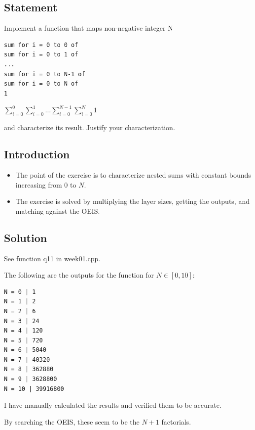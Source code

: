 \documentclass[12pt]{article}
\begin{document}

\subsection{Statement}

Implement a function that maps non-negative integer N

\begin{verbatim}
sum for i = 0 to 0 of
sum for i = 0 to 1 of
...
sum for i = 0 to N-1 of
sum for i = 0 to N of
1
\end{verbatim}

$\displaystyle\sum_{i=0}^{0}\sum_{i=0}^{1}\dots\sum_{i=0}^{N-1}\sum_{i=0}^{N}1$

and characterize its result. Justify your characterization.


\subsection{Introduction}

\begin{itemize}

\item
  The point of the exercise is to characterize nested sums with constant bounds increasing from 0 to $N$.

\item
  The exercise is solved by multiplying the layer sizes, getting the outputs, and matching against the OEIS.

\end{itemize}


\subsection{Solution}

See function q11 in week01.cpp.

The following are the outputs for the function for $N \in [0,10]$:

\begin{verbatim}
N = 0 | 1
N = 1 | 2
N = 2 | 6
N = 3 | 24
N = 4 | 120
N = 5 | 720
N = 6 | 5040
N = 7 | 40320
N = 8 | 362880
N = 9 | 3628800
N = 10 | 39916800
\end{verbatim}

I have manually calculated the results and verified them to be accurate.

By searching the OEIS, these seem to be the $N + 1$ factorials.
\end{document}
